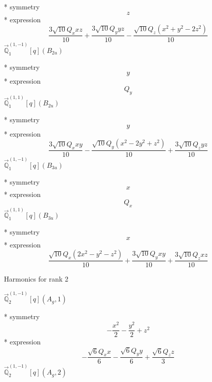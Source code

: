 \documentclass[fleqn,8pt]{jsarticle}
\begin{document}
\noindent\quad ** symmetry
\begin{dmath*}
z
\end{dmath*}
\noindent\quad ** expression
\begin{dmath*}
\frac{3 \sqrt{10} Q_{x} x z}{10} + \frac{3 \sqrt{10} Q_{y} y z}{10} - \frac{\sqrt{10} Q_{z} \left(x^{2} + y^{2} - 2 z^{2}\right)}{10}
\end{dmath*}
\noindent\quad $\vec{\mathbb{Q}}_{1}^{(1,-1)}[q](B_{2u})$

\noindent\quad ** symmetry
\begin{dmath*}
y
\end{dmath*}
\noindent\quad ** expression
\begin{dmath*}
Q_{y}
\end{dmath*}
\noindent\quad $\vec{\mathbb{Q}}_{1}^{(1,1)}[q](B_{2u})$

\noindent\quad ** symmetry
\begin{dmath*}
y
\end{dmath*}
\noindent\quad ** expression
\begin{dmath*}
\frac{3 \sqrt{10} Q_{x} x y}{10} - \frac{\sqrt{10} Q_{y} \left(x^{2} - 2 y^{2} + z^{2}\right)}{10} + \frac{3 \sqrt{10} Q_{z} y z}{10}
\end{dmath*}
\noindent\quad $\vec{\mathbb{Q}}_{1}^{(1,-1)}[q](B_{3u})$

\noindent\quad ** symmetry
\begin{dmath*}
x
\end{dmath*}
\noindent\quad ** expression
\begin{dmath*}
Q_{x}
\end{dmath*}
\noindent\quad $\vec{\mathbb{Q}}_{1}^{(1,1)}[q](B_{3u})$

\noindent\quad ** symmetry
\begin{dmath*}
x
\end{dmath*}
\noindent\quad ** expression
\begin{dmath*}
\frac{\sqrt{10} Q_{x} \left(2 x^{2} - y^{2} - z^{2}\right)}{10} + \frac{3 \sqrt{10} Q_{y} x y}{10} + \frac{3 \sqrt{10} Q_{z} x z}{10}
\end{dmath*}

\noindent * Harmonics for rank 2

\noindent\quad $\vec{\mathbb{Q}}_{2}^{(1,-1)}[q](A_{g},1)$

\noindent\quad ** symmetry
\begin{dmath*}
- \frac{x^{2}}{2} - \frac{y^{2}}{2} + z^{2}
\end{dmath*}
\noindent\quad ** expression
\begin{dmath*}
- \frac{\sqrt{6} Q_{x} x}{6} - \frac{\sqrt{6} Q_{y} y}{6} + \frac{\sqrt{6} Q_{z} z}{3}
\end{dmath*}
\noindent\quad $\vec{\mathbb{Q}}_{2}^{(1,-1)}[q](A_{g},2)$
\end{document}
